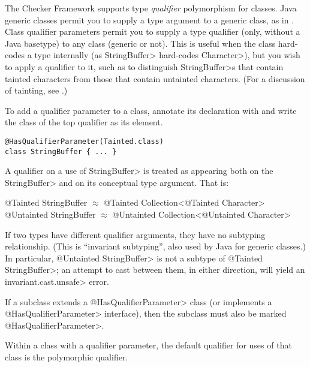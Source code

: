 
The Checker Framework supports type \emph{qualifier} polymorphism for classes.
Java generic classes permit you to supply a type argument to a generic
class, as in .
Class qualifier parameters permit you to supply a type qualifier (only,
without a Java basetype) to any
class (generic or not).
This is useful when the class hard-codes a type internally (as
\<StringBuffer> hard-codes \<Character>), but you wish to apply a qualifier
to it, such as to distinguish \<StringBuffer>s that contain tainted
characters from those that contain untainted characters.  (For a discussion
of tainting, see .)

To add a qualifier parameter to a class, annotate its declaration with 
and write the class of the top qualifier as its element.

\begin{Verbatim}
@HasQualifierParameter(Tainted.class)
class StringBuffer { ... }
\end{Verbatim}

A qualifier on a use of \<StringBuffer> is treated as
appearing both on the \<StringBuffer> and on its conceptual type argument.  That
is:\\
\begin{tt}
  @Tainted StringBuffer $\approx$ @Tainted Collection<@Tainted Character>\\
  @Untainted StringBuffer $\approx$ @Untainted Collection<@Untainted Character>
\end{tt}

If two types have different qualifier arguments, they have no subtyping
relationship.  (This is ``invariant subtyping'', also used by Java for
generic classes.)  In particular, \<@Untainted StringBuffer> is not a
subtype of \<@Tainted StringBuffer>; an attempt to cast between them, in
either direction, will yield an \<invariant.cast.unsafe> error.

If a subclass extends a \<@HasQualifierParameter> class (or implements a
\<@HasQualifierParameter> interface), then the subclass must also be marked
\<@HasQualifierParameter>.


Within a class with a qualifier parameter,
the default qualifier for uses of that class is the polymorphic qualifier.



